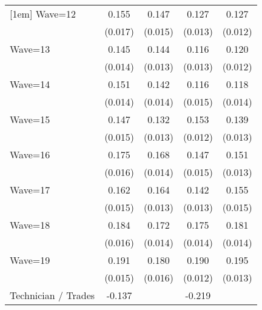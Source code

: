 {\begin{tabular}{l*{4}{c}}
[1em]
Wave=12             &       0.155\sym{***}&       0.147\sym{***}&       0.127\sym{***}&       0.127\sym{***}\\
                    &     (0.017)         &     (0.015)         &     (0.013)         &     (0.012)         \\
[1em]
Wave=13             &       0.145\sym{***}&       0.144\sym{***}&       0.116\sym{***}&       0.120\sym{***}\\
                    &     (0.014)         &     (0.013)         &     (0.013)         &     (0.012)         \\
[1em]
Wave=14             &       0.151\sym{***}&       0.142\sym{***}&       0.116\sym{***}&       0.118\sym{***}\\
                    &     (0.014)         &     (0.014)         &     (0.015)         &     (0.014)         \\
[1em]
Wave=15             &       0.147\sym{***}&       0.132\sym{***}&       0.153\sym{***}&       0.139\sym{***}\\
                    &     (0.015)         &     (0.013)         &     (0.012)         &     (0.013)         \\
[1em]
Wave=16             &       0.175\sym{***}&       0.168\sym{***}&       0.147\sym{***}&       0.151\sym{***}\\
                    &     (0.016)         &     (0.014)         &     (0.015)         &     (0.013)         \\
[1em]
Wave=17             &       0.162\sym{***}&       0.164\sym{***}&       0.142\sym{***}&       0.155\sym{***}\\
                    &     (0.015)         &     (0.013)         &     (0.013)         &     (0.015)         \\
[1em]
Wave=18             &       0.184\sym{***}&       0.172\sym{***}&       0.175\sym{***}&       0.181\sym{***}\\
                    &     (0.016)         &     (0.014)         &     (0.014)         &     (0.014)         \\
[1em]
Wave=19             &       0.191\sym{***}&       0.180\sym{***}&       0.190\sym{***}&       0.195\sym{***}\\
                    &     (0.015)         &     (0.016)         &     (0.012)         &     (0.013)         \\
[1em]
Technician / Trades &      -0.137\sym{***}&                     &      -0.219\sym{***}&                     \\

\end{tabular}}
